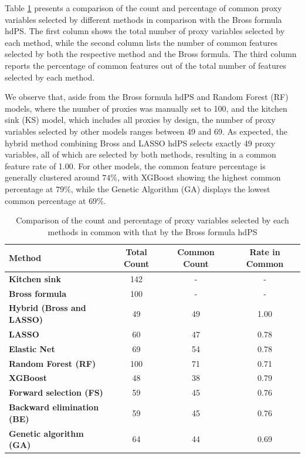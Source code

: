 \documentclass[sn-vancouver,Numbered,lineno,pdflatex]{sn-jnl}
\begin{document}
Table \ref{tab:proxy-common-pct-bross} presents a comparison of the
count and percentage of common proxy variables selected by different
methods in comparison with the Bross formula hdPS. The first column
shows the total number of proxy variables selected by each method, while
the second column lists the number of common features selected by both
the respective method and the Bross formula. The third column reports
the percentage of common features out of the total number of features
selected by each method.

We observe that, aside from the Bross formula hdPS and Random Forest
(RF) models, where the number of proxies was manually set to 100, and
the kitchen sink (KS) model, which includes all proxies by design, the
number of proxy variables selected by other models ranges between 49 and
69. As expected, the hybrid method combining Bross and LASSO hdPS
selects exactly 49 proxy variables, all of which are selected by both
methods, resulting in a common feature rate of 1.00. For other models,
the common feature percentage is generally clustered around \(74\%\),
with XGBoost showing the highest common percentage at \(79\%\), while
the Genetic Algorithm (GA) displays the lowest common percentage at
\(69\%\).

\begin{table}[htbp]
\centering
\caption{Comparison of the count and percentage of proxy variables selected by each methods in common with that by the Bross formula hdPS}
\label{tab:proxy-common-pct-bross}
\begin{tabular}{lccc}
\toprule
\textbf{Method} & \textbf{Total Count} & \textbf{Common Count} & \textbf{Rate in Common} \\ 
\midrule
\textbf{Kitchen sink} & 142 & - & - \\
\textbf{Bross formula} & 100 & - & - \\
\textbf{Hybrid (Bross and LASSO)} & 49 & 49 & 1.00 \\
\textbf{LASSO} & 60 & 47 & 0.78 \\
\textbf{Elastic Net} & 69 & 54 & 0.78 \\
\textbf{Random Forest (RF)} & 100 & 71 & 0.71 \\  
\textbf{XGBoost} & 48 & 38 & 0.79 \\
\textbf{Forward selection (FS)} & 59 & 45 & 0.76 \\
\textbf{Backward elimination (BE)} & 59 & 45 & 0.76 \\
\textbf{Genetic algorithm (GA)} & 64 & 44 & 0.69 \\
\bottomrule
\end{tabular}
\end{table}
\end{document}
